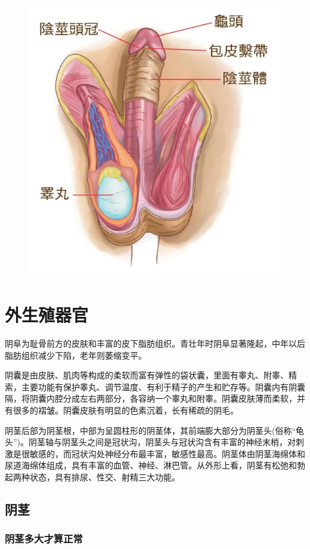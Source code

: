 \documentclass[12pt,UTF8]{ctexbook}
\begin{document}
\begin{figure}[htbp]
	\centering
	\includegraphics[width=0.7\linewidth]{13}
	\caption{}
\end{figure}

\section{外生殖器官}

阴阜为耻骨前方的皮肤和丰富的皮下脂肪组织。青壮年时阴阜显著隆起，中年以后脂肪组织减少下陷，老年则萎缩变平。

阴囊是由皮肤、肌肉等构成的柔软而富有弹性的袋状囊，里面有睾丸、附睾、精索，主要功能有保护睾丸、调节温度、有利于精子的产生和贮存等。阴囊内有阴囊隔，将阴囊内腔分成左右两部分，各容纳一个睾丸和附睾。阴囊皮肤薄而柔软，并有很多的褶皱。阴囊皮肤有明显的色素沉着，长有稀疏的阴毛。

阴茎后部为阴茎根，中部为呈圆柱形的阴茎体，其前端膨大部分为阴茎头(俗称“龟头”)。阴茎轴与阴茎头之间是冠状沟，阴茎头与冠状沟含有丰富的神经末梢，对刺激是很敏感的，而冠状沟处神经分布最丰富，敏感性最高。阴茎体由阴茎海绵体和尿道海绵体组成，具有丰富的血管、神经、淋巴管。从外形上看，阴茎有松弛和勃起两种状态，具有排尿、性交、射精三大功能。

\subsection{阴茎}

\subsubsection{阴茎多大才算正常}
\end{document}
